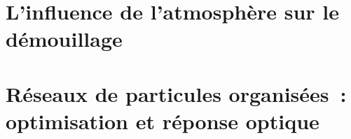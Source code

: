 \documentclass[12pt,french]{report}
\begin{document}
\chapter{L'influence de l'atmosphère sur le démouillage}


\chapter{Réseaux de particules organisées~: optimisation et réponse optique}




%
%
\end{document}
